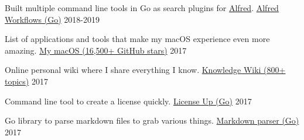 
\begin{cventries}

  \cventry
    {Built multiple command line tools in Go as search plugins for \href{https://www.alfredapp.com}{Alfred}.}
    {\href{https://wiki.nikitavoloboev.xyz/sharing/my-github}{Alfred Workflows (Go)}}
    {}
    {2018-2019}
    {
    }

    \cventry
    {List of applications and tools that make my macOS experience even more amazing.}
    {\href{https://github.com/nikitavoloboev/my-mac-os}{My macOS (16,500+ GitHub stars)}}
    {}
    {2017}
    {
    }

    \cventry
    {Online personal wiki where I share everything I know.}
    {\href{https://wiki.nikitavoloboev.xyz}{Knowledge Wiki (800+ topics)}}
    {}
    {2017}
    {
    }

    \cventry
    {Command line tool to create a license quickly.}
    {\href{https://github.com/nikitavoloboev/license-up}{License Up (Go)}}
    {}
    {2017}
    {
    }

    \cventry
    {Go library to parse markdown files to grab various things.}
    {\href{https://github.com/nikitavoloboev/markdown-parser}{Markdown parser (Go)}}
    {}
    {2017}
    {
    }

\end{cventries}
